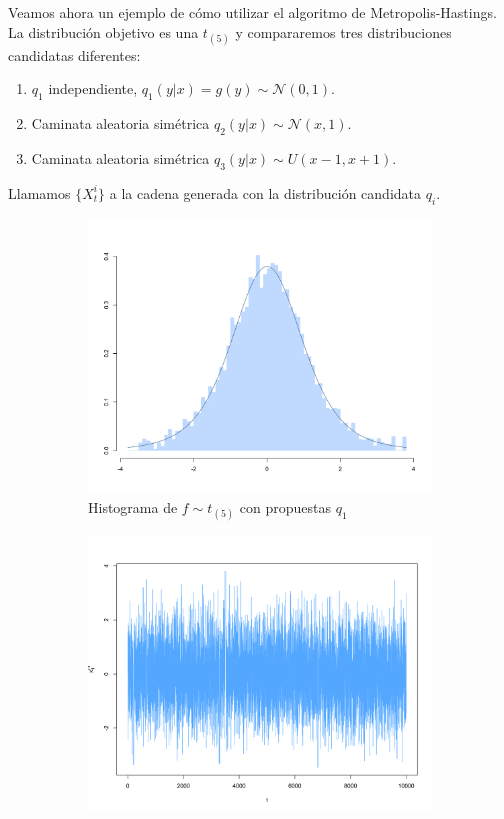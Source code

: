 \documentclass[11pt,a4paper]{article}
\begin{document}
Veamos ahora un ejemplo de cómo utilizar el algoritmo de Metropolis-Hastings. La distribución objetivo es una $t_{(5)}$ y compararemos tres distribuciones candidatas diferentes:
\begin{enumerate}
\item $q_1$ independiente, $q_1(y|x) = g(y) \sim \mathcal{N}(0, 1).$
\item Caminata aleatoria simétrica $q_2(y|x) \sim \mathcal{N}(x, 1).$
\item Caminata aleatoria simétrica $q_3(y|x) \sim U(x - 1, x + 1).$
\end{enumerate}
Llamamos $\lbrace X_t^i \rbrace$ a la cadena generada con la distribución candidata $q_i$.\\

\begin{figure}
    \centering
    \begin{subfigure}[t]{0.45\textwidth}
        \centering
        \includegraphics[width=\linewidth]{mh_hist_x1.png} 
        \caption{Histograma de $f \sim t_{(5)}$ con propuestas $q_1$} \label{fig:mh_hist_x1}
    \end{subfigure}
    \hfill
    \begin{subfigure}[t]{0.45\textwidth}
        \centering
        \includegraphics[width=\linewidth]{mh_chain_x1.png} 

\end{subfigure}
\end{figure}
\end{document}

